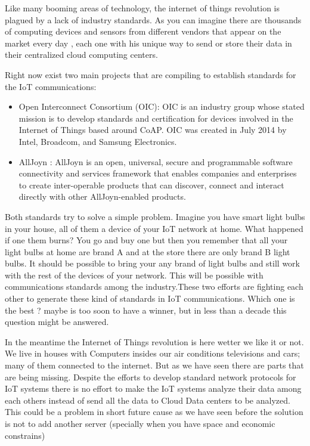 Like many booming areas of technology, the internet of things revolution is
plagued by a lack of industry standards. As you can imagine there are thousands
of computing devices and sensors from different vendors that appear on the
market  every day , each one with his unique way to send  or store their data
in their centralized cloud computing centers.

Right now exist two main projects that are compiling to establish standards for
the IoT communications: 

\begin{itemize}
\item Open Interconnect Consortium (OIC): OIC is an industry group whose stated 
mission is to develop standards and certification for devices involved in the 
Internet of Things based around CoAP. OIC was created in July 2014 by Intel, 
Broadcom, and Samsung Electronics.\cite{OIC}

\item AllJoyn : AllJoyn is an open, universal, secure and programmable software 
connectivity and services framework that enables companies and enterprises to 
create inter-operable products that can discover, connect and interact directly 
with other AllJoyn-enabled products. \cite{AllJoyn}
\end{itemize}


Both standards try to solve a simple problem. Imagine you have smart light bulbs
in your house, all of them a device of your IoT network at home. What happened
if one them burns? You go and buy one but then you remember that all your
light bulbs at home are brand A and at the store there are only brand B
light bulbs. It should be possible to bring your any brand of light bulbs and
still work with the rest of the devices of your network. This will be possible
with communications standards among the industry.These two efforts are fighting
each other to generate these kind of standards in IoT communications. Which one
is the best ? maybe is too soon to have a winner, but in less than a decade
this question might be answered. 

In the meantime the Internet of Things revolution is here wetter we like it or
not. We live in houses with Computers insides our air conditions televisions
and cars; many of them connected to the internet. But as we have seen there are
parts that are being missing. Despite the efforts to develop standard network
protocols for IoT systems there is no effort to make the IoT systems analyze
their data among each others instead of send  all the data to Cloud Data centers
to be analyzed. This could be a problem in short future cause as we have seen
before the solution is not to add another server (specially when you have space
and economic constrains)


